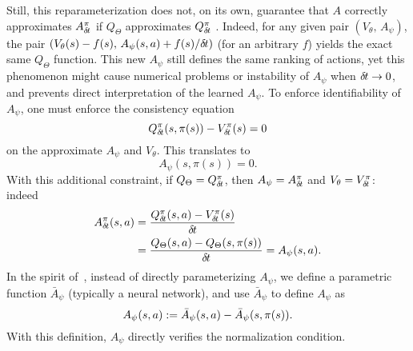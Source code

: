 Still, this reparameterization does not, on its own, guarantee that $A$
correctly approximates $A^\pi_{\delta\hspace{-.1em}t}$ if
$Q_\Theta$ approximates $Q^\pi_{\delta\hspace{-.1em}t}$%
.
Indeed, for any given pair $(V_\theta,\,A_\psi)$, the pair $(V_\theta(s) -
f(s),\,A_\psi(s,a)+f(s)/{\delta\hspace{-.1em}t})$ (for an arbitrary $f$)
yields the exact same $Q_\Theta$ function. This new $A_\psi$ still defines %
the same ranking of actions, yet this phenomenon might cause
numerical problems or instability of $A_\psi$ when ${\delta\hspace{-.1em}t}\to 0$, and prevents direct
interpretation of the learned $A_\psi$.
To enforce identifiability of $A_\psi$, one must enforce the consistency equation
\begin{equation}
	Q^\pi_{\delta\hspace{-.1em}t}(s, \pi(s)) - V^\pi_{\delta\hspace{-.1em}t}(s) = 0
\end{equation}
on the approximate $A_\psi$ and $V_\theta$. This translates to
\begin{equation}
	A_\psi(s, \pi(s)) = 0.
\end{equation}
With this additional constraint, if $Q_\Theta = Q^\pi_{\delta\hspace{-.1em}t}$, then $A_\psi =
A^\pi_{\delta\hspace{-.1em}t}$ and $V_\theta = V^\pi_{\delta\hspace{-.1em}t}$: indeed
\begin{align}
	A^\pi_{\delta\hspace{-.1em}t}(s, a) &= \frac{Q^\pi_{\delta\hspace{-.1em}t}(s,a) - V^\pi_{\delta\hspace{-.1em}t}(s)}{{\delta\hspace{-.1em}t}}\\
		    &= \frac{Q_\Theta(s,a) - Q_\Theta(s, \pi(s))}{{\delta\hspace{-.1em}t}}
		    = A_\psi(s, a).
\end{align}
In the spirit of~\cite{dueling_nets}, instead of directly parameterizing $A_\psi$,
we define a parametric function $\bar{A}_\psi$ (typically a neural network),
and use $\bar{A}_\psi$ to define $A_\psi$ as
\begin{equation}
\label{eq:Aparam}
	A_\psi(s, a) \mathrel{\mathop{:}}= \bar{A}_\psi(s, a) - \bar{A}_\psi(s, \pi(s)).
\end{equation}
With this definition, $A_\psi$ directly verifies the normalization condition.

